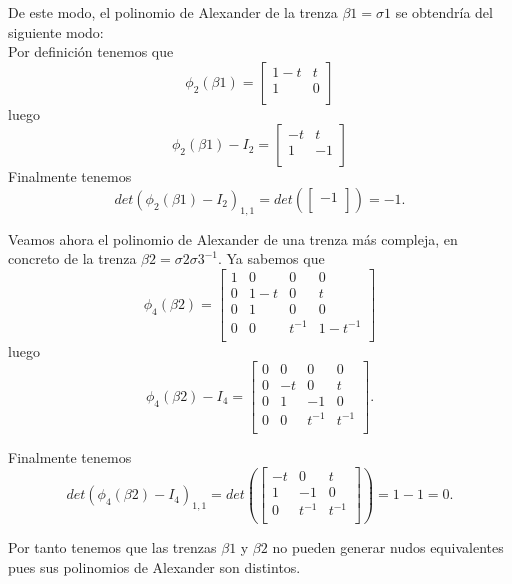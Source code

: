 De este modo, el polinomio de Alexander de la trenza $\beta1 = \sigma1$ se obtendría del siguiente modo:\\
Por definición tenemos que  
\[ \phi_{2} (\beta1) = \begin{bmatrix}
1-t & t  \\
1 & 0 \\
\end{bmatrix}\]
luego 
\[ \phi_{2} (\beta1) - I_{2}= \begin{bmatrix}
-t & t  \\
1 & -1 \\
\end{bmatrix}\]
Finalmente tenemos 
\[ det(\phi_{2} (\beta1) - I_{2})_{1,1} = det(\begin{bmatrix}
-1 \\
\end{bmatrix}) = -1.\]

Veamos ahora el polinomio de Alexander de una trenza más compleja, en concreto de la trenza $\beta2 = \sigma2\sigma3^{-1}$. Ya sabemos que 
 \[ \phi_{4} (\beta2) = \begin{bmatrix}
 1 & 0 & 0 & 0 \\
 0 & 1-t & 0 & t \\
 0 & 1 & 0 & 0  \\	
 0 & 0 & t^{-1} & 1-t^{-1} \\
 \end{bmatrix}\]
 luego
  \[ \phi_{4} (\beta2) - I_{4} = \begin{bmatrix}
  0 & 0 & 0 & 0 \\
  0 & -t & 0 & t \\
  0 & 1 & -1 & 0  \\	
  0 & 0 & t^{-1} & t^{-1} \\
  \end{bmatrix}.\]
  
  Finalmente tenemos 
    \[ det(\phi_{4} (\beta2) - I_{4})_{1,1} = det(\begin{bmatrix}
    -t & 0 & t \\
     1 & -1 & 0  \\	
     0 & t^{-1} & t^{-1} \\
    \end{bmatrix}) = 1-1 = 0.\]
    
Por tanto tenemos que las trenzas $\beta1$ y $\beta2$ no pueden generar nudos equivalentes pues sus polinomios de Alexander son distintos.\\
    
